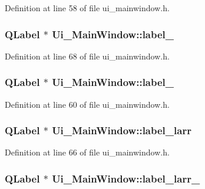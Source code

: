 Definition at line 58 of file ui\+\_\+mainwindow.\+h.

\subsubsection[{\texorpdfstring{label\+\_\+8}{label_8}}]{\setlength{\rightskip}{0pt plus 5cm}Q\+Label $\ast$ Ui\+\_\+\+Main\+Window\+::label\+\_}\hypertarget{class_ui___main_window_aae1122bf5c5f6daf310a93072a5eb72a}{}\label{class_ui___main_window_aae1122bf5c5f6daf310a93072a5eb72a}


Definition at line 68 of file ui\+\_\+mainwindow.\+h.

\subsubsection[{\texorpdfstring{label\+\_\+9}{label_9}}]{\setlength{\rightskip}{0pt plus 5cm}Q\+Label $\ast$ Ui\+\_\+\+Main\+Window\+::label\+\_}\hypertarget{class_ui___main_window_abbe5a2168615ca342d06286db75927bc}{}\label{class_ui___main_window_abbe5a2168615ca342d06286db75927bc}


Definition at line 60 of file ui\+\_\+mainwindow.\+h.

\subsubsection[{\texorpdfstring{label\+\_\+larr}{label_larr}}]{\setlength{\rightskip}{0pt plus 5cm}Q\+Label $\ast$ Ui\+\_\+\+Main\+Window\+::label\+\_\+larr}\hypertarget{class_ui___main_window_aa107ef3f0a591af5ab5a53feeaf98cf5}{}\label{class_ui___main_window_aa107ef3f0a591af5ab5a53feeaf98cf5}


Definition at line 66 of file ui\+\_\+mainwindow.\+h.

\subsubsection[{\texorpdfstring{label\+\_\+larr\+\_\+2}{label_larr_2}}]{\setlength{\rightskip}{0pt plus 5cm}Q\+Label $\ast$ Ui\+\_\+\+Main\+Window\+::label\+\_\+larr\+\_}\hypertarget{class_ui___main_window_a9952714064881810c364b0c31d2d59df}{}\label{class_ui___main_window_a9952714064881810c364b0c31d2d59df}


